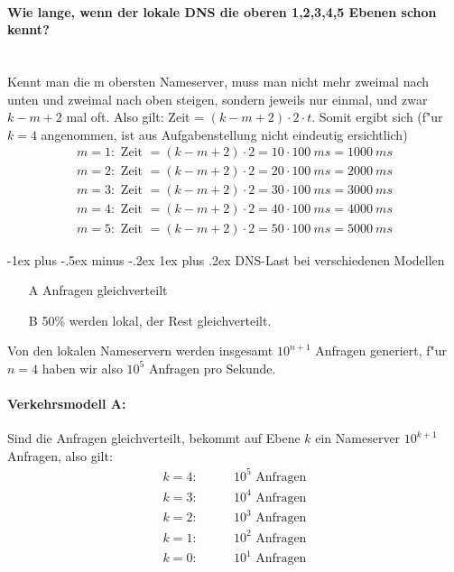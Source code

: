 \documentclass[10pt,landscape]{article}
\makeatletter
\renewcommand{\subsubsection}{\@startsection{subsubsection}{3}{0mm}%
                                {-1ex plus -.5ex minus -.2ex}%
                                {1ex plus .2ex}%
                                {\normalfont\small\bfseries}}
\makeatother
\begin{document}
\begin{multicols}{3}
\paragraph{Wie lange, wenn der lokale DNS die oberen 1,2,3,4,5 Ebenen schon kennt?} \ \\ 
Kennt man die m obersten Nameserver, muss man nicht mehr zweimal nach unten und zweimal nach oben steigen, 
sondern jeweils nur einmal, und zwar $k-m+2$ mal oft. 
Also gilt: Zeit = $(k - m + 2) \cdot 2 \cdot t$. Somit ergibt sich 
(f"ur $k = 4$ angenommen, ist aus Aufgabenstellung nicht eindeutig ersichtlich)
\begin{align*}
    m = 1: \text{ Zeit } = (k - m + 2) \cdot 2 = 10 \cdot 100\ ms = 1000\ ms\\    
    m = 2: \text{ Zeit } = (k - m + 2) \cdot 2 = 20 \cdot 100\ ms = 2000\ ms\\
    m = 3: \text{ Zeit } = (k - m + 2) \cdot 2 = 30 \cdot 100\ ms = 3000\ ms\\
    m = 4: \text{ Zeit } = (k - m + 2) \cdot 2 = 40 \cdot 100\ ms = 4000\ ms\\
    m = 5: \text{ Zeit } = (k - m + 2) \cdot 2 = 50 \cdot 100\ ms = 5000\ ms
\end{align*}

\newpage
\subsubsection{DNS-Last bei verschiedenen Modellen}
\begin{itemize}
    \item[A] Anfragen gleichverteilt
    \item[B] 50\% werden lokal, der Rest gleichverteilt.
\end{itemize}
Von den lokalen Nameservern werden insgesamt $10^{n+1}$ Anfragen generiert, 
f"ur $n = 4$ haben wir also $10^5$ Anfragen pro Sekunde.
\paragraph{Verkehrsmodell A:}
Sind die Anfragen gleichverteilt, bekommt auf Ebene $k$ ein Nameserver $10^{k+1}$ Anfragen, also gilt:
\begin{align*}
    k = 4:\qquad & 10^5 \text{ Anfragen}\\
    k = 3:\qquad & 10^4 \text{ Anfragen}\\
    k = 2:\qquad & 10^3 \text{ Anfragen}\\
    k = 1:\qquad & 10^2 \text{ Anfragen}\\
    k = 0:\qquad & 10^1 \text{ Anfragen}
\end{align*}



\end{multicols}
\end{document}
